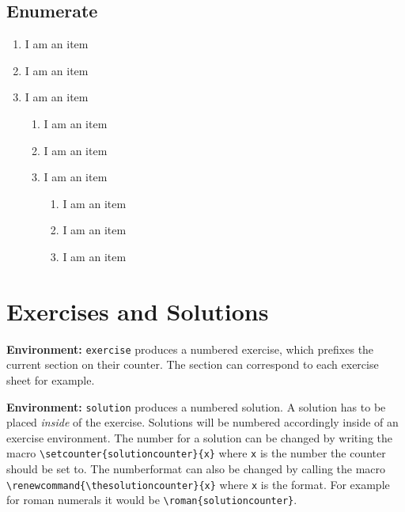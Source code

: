 \documentclass[10pt]{article}
\newcommand{\environmentcmd}[1]{\par\noindent\textbf{Environment:} \lstinline{#1}}
\begin{document}
\subsection{Enumerate}
\begin{enumerate}
  \item I am an item
  \item I am an item
  \item I am an item
        \begin{enumerate}
          \item I am an item
          \item I am an item
          \item I am an item
                \begin{enumerate}
                  \item I am an item
                  \item I am an item
                  \item I am an item
                \end{enumerate}
        \end{enumerate}
\end{enumerate}

\newpage
\section{Exercises and Solutions}
\environmentcmd{exercise} produces a numbered exercise, which prefixes the current section on their counter. The section can correspond to each exercise sheet for example.

\environmentcmd{solution} produces a numbered solution. A solution has to be placed \emph{inside} of the exercise. Solutions will be numbered accordingly inside of an exercise environment. The number for a solution can be changed by writing the macro \lstinline|\setcounter{solutioncounter}{x}| where \lstinline{x} is the number the counter should be set to.
The numberformat can also be changed by calling the macro \lstinline|\renewcommand{\thesolutioncounter}{x}| where \lstinline{x} is the format. For example for roman numerals it would be \lstinline|\roman{solutioncounter}|.

\begin{exercise}
  \lipsum[1-1]
  \begin{solution}
    \lipsum[1-1]
  \end{solution}
  \begin{solution}
    \lipsum[1-1]
  \end{solution}
  \begin{solution}
    \lipsum[1-1]
  \end{solution}
\end{exercise}
\end{document}
